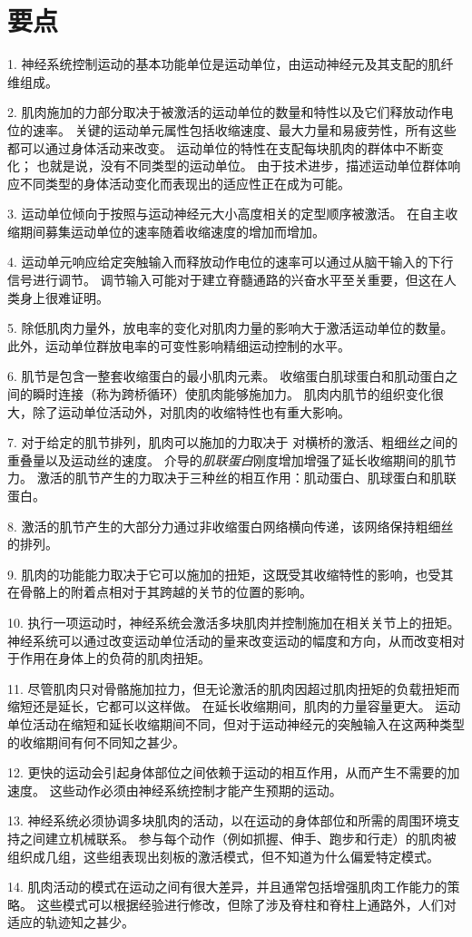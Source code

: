 \section{要点}

1. 神经系统控制运动的基本功能单位是运动单位，由运动神经元及其支配的肌纤维组成。 


2. 肌肉施加的力部分取决于被激活的运动单位的数量和特性以及它们释放动作电位的速率。
关键的运动单元属性包括收缩速度、最大力量和易疲劳性，所有这些都可以通过身体活动来改变。
运动单位的特性在支配每块肌肉的群体中不断变化；
也就是说，没有不同类型的运动单位。
由于技术进步，描述运动单位群体响应不同类型的身体活动变化而表现出的适应性正在成为可能。


3. 运动单位倾向于按照与运动神经元大小高度相关的定型顺序被激活。
在自主收缩期间募集运动单位的速率随着收缩速度的增加而增加。


4. 运动单元响应给定突触输入而释放动作电位的速率可以通过从脑干输入的下行信号进行调节。
调节输入可能对于建立脊髓通路的兴奋水平至关重要，但这在人类身上很难证明。


5. 除低肌肉力量外，放电率的变化对肌肉力量的影响大于激活运动单位的数量。
此外，运动单位群放电率的可变性影响精细运动控制的水平。


6. 肌节是包含一整套收缩蛋白的最小肌肉元素。
收缩蛋白肌球蛋白和肌动蛋白之间的瞬时连接（称为跨桥循环）使肌肉能够施加力。
肌肉内肌节的组织变化很大，除了运动单位活动外，对肌肉的收缩特性也有重大影响。


7. 对于给定的肌节排列，肌肉可以施加的力取决于  对横桥的激活、粗细丝之间的重叠量以及运动丝的速度。
 介导的\textit{肌联蛋白}刚度增加增强了延长收缩期间的肌节力。
激活的肌节产生的力取决于三种丝的相互作用：肌动蛋白、肌球蛋白和肌联蛋白。


8. 激活的肌节产生的大部分力通过非收缩蛋白网络横向传递，该网络保持粗细丝的排列。


9. 肌肉的功能能力取决于它可以施加的扭矩，这既受其收缩特性的影响，也受其在骨骼上的附着点相对于其跨越的关节的位置的影响。


10. 执行一项运动时，神经系统会激活多块肌肉并控制施加在相关关节上的扭矩。
神经系统可以通过改变运动单位活动的量来改变运动的幅度和方向，从而改变相对于作用在身体上的负荷的肌肉扭矩。


11. 尽管肌肉只对骨骼施加拉力，但无论激活的肌肉因超过肌肉扭矩的负载扭矩而缩短还是延长，它都可以这样做。
在延长收缩期间，肌肉的力量容量更大。
运动单位活动在缩短和延长收缩期间不同，但对于运动神经元的突触输入在这两种类型的收缩期间有何不同知之甚少。


12. 更快的运动会引起身体部位之间依赖于运动的相互作用，从而产生不需要的加速度。
这些动作必须由神经系统控制才能产生预期的运动。


13. 神经系统必须协调多块肌肉的活动，以在运动的身体部位和所需的周围环境支持之间建立机械联系。
参与每个动作（例如抓握、伸手、跑步和行走）的肌肉被组织成几组，这些组表现出刻板的激活模式，但不知道为什么偏爱特定模式。


14. 肌肉活动的模式在运动之间有很大差异，并且通常包括增强肌肉工作能力的策略。
这些模式可以根据经验进行修改，但除了涉及脊柱和脊柱上通路外，人们对适应的轨迹知之甚少。


